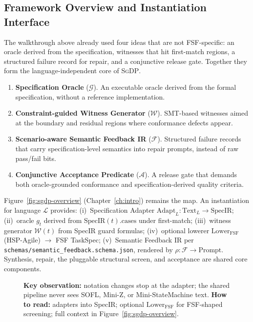 \subsection{Framework Overview and Instantiation Interface}
\label{subsec:framework-overview}

The walkthrough above already used four ideas that are not FSF-specific:
an oracle derived from the specification, witnesses that hit first-match
regions, a structured failure record for repair, and a conjunctive release
gate.
Together they form the language-independent core of \textsc{SgDP}.

\begin{enumerate}
  \item \textbf{Specification Oracle} ($\mathcal{G}$).
    An executable oracle derived from the formal specification, without a
    reference implementation.
  \item \textbf{Constraint-guided Witness Generator} ($\mathcal{W}$).
    SMT-based witnesses aimed at the boundary and residual regions where
    conformance defects appear.
  \item \textbf{Scenario-aware Semantic Feedback IR} ($\mathcal{F}$).
    Structured failure records that carry specification-level semantics into
    repair prompts, instead of raw pass/fail bits.
  \item \textbf{Conjunctive Acceptance Predicate} ($\mathcal{A}$).
    A release gate that demands both oracle-grounded conformance and
    specification-derived quality criteria.
\end{enumerate}

Figure~\ref{fig:sgdp-overview} (Chapter~\ref{ch:intro}) remains the map.
An instantiation for language $\mathcal{L}$ provides:
(i)~Specification Adapter $\text{Adapt}_L : \text{Text}_L \to \text{SpecIR}$;
(ii)~oracle $g_t$ derived from $\text{SpecIR}(t).\text{cases}$ under first-match;
(iii)~witness generator $\mathcal{W}(t)$ from SpecIR guard formulas;
(iv)~optional lowerer $\text{Lower}_{\text{FSF}}$ (HSP-Agile) $\to$ FSF TaskSpec;
(v)~Semantic Feedback IR per \texttt{schemas/semantic\_feedback.schema.json},
    rendered by $\rho : \mathcal{F} \to \text{Prompt}$.
Synthesis, repair, the pluggable structural screen, and acceptance are
shared core components.

\begin{figure}[t]
  \centering
  \caption{\textbf{Key observation:} notation changes stop at the adapter;
    the shared pipeline never sees SOFL, Mini-Z, or Mini-StateMachine text.
    \textbf{How to read:} adapters into SpecIR; optional
    $\text{Lower}_{\text{FSF}}$ for FSF-shaped screening; full context in
    Figure~\ref{fig:sgdp-overview}.}
  \label{fig:specir-arch}
\end{figure}

